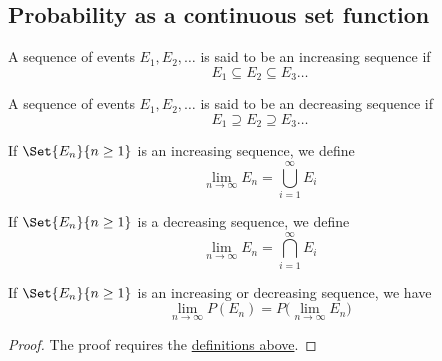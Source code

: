 \subsection{Probability as a continuous set function}\label{fad1d93}

\label{cbc0142}

A sequence of events $E_1,E_2,\ldots$ is said to be an increasing sequence if
$$
  E_1\subseteq E_2\subseteq E_3\ldots
$$

\label{ed3485a}

A sequence of events $E_1,E_2,\ldots$ is said to be an decreasing sequence if
$$
  E_1\supseteq E_2\supseteq E_3\ldots
$$

\label{e6c1dd4}

\begin{enumerati}
  \item If $\Set{E_n}{n\geq1}$ is an increasing sequence, we define
  $$
    \lim_{n\to\infty}E_n=\bigcup_{i=1}^\infty E_i
  $$
  \item If $\Set{E_n}{n\geq1}$ is a decreasing sequence, we define
  $$
    \lim_{n\to\infty}E_n=\bigcap_{i=1}^\infty E_i
  $$
\end{enumerati}

\label{e3bf7df}

If $\Set{E_n}{n\geq1}$ is an increasing or decreasing sequence, we have
$$
  \lim_{n\to\infty}P(E_n)=P\bigl(\lim_{n\to\infty}E_n\bigr)
$$

\begin{proof}
  The proof requires the \href{e6c1dd4}{definitions above}.
\end{proof}
